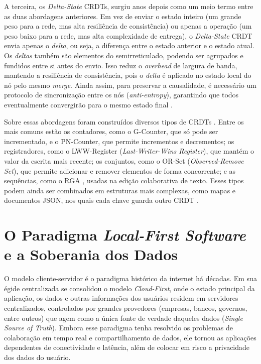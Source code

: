 A terceira, os \textit{Delta-State} CRDTs, surgiu anos depois como um meio termo entre as duas abordagens anteriores. Em vez de enviar o estado inteiro (um grande peso para a rede, mas alta
resiliência de consistência) ou apenas a operação (um peso baixo para a rede, mas alta complexidade de entrega), o \textit{Delta-State} CRDT envia apenas o \textit{delta}, ou seja,
a diferença entre o estado anterior e o estado atual. Os \textit{deltas} também são elementos do semirreticulado, podendo ser agrupados e fundidos
entre si antes do envio. Isso reduz o \textit{overhead} de largura de banda, mantendo a resiliência de consistência, pois o \textit{delta} é aplicado
no estado local do nó pelo mesmo \textit{merge}. Ainda assim, para preservar a causalidade, é necessário um protocolo de sincronização entre os nós
(\textit{anti-entropy}), garantindo que todos eventualmente convergirão para o mesmo estado final \cite{almeida2018}.

Sobre essas abordagens foram construídos diversos tipos de CRDTs \cite{shapiro2011comprehensive}. Entre os mais comuns estão os contadores,
como o G-Counter, que só pode ser incrementado, e o PN-Counter, que permite incrementos e decrementos; os registradores, como o LWW-Register
(\textit{Last-Writer-Wins Register}), que mantém o valor da escrita mais recente; os conjuntos, como o OR-Set (\textit{Observed-Remove Set}),
que permite adicionar e remover elementos de forma concorrente; e as sequências, como o RGA \cite{roh2011}, usadas na edição colaborativa
de texto. Esses tipos podem ainda ser combinados em estruturas mais complexas, como mapas e documentos JSON, nos quais cada chave guarda
outro CRDT \cite{kleppmannberesford2017}.

\section{O Paradigma \textit{Local-First Software} e a Soberania dos Dados}

O modelo cliente-servidor é o paradigma histórico da internet há décadas. Em sua égide centralizada se consolidou o
modelo \textit{Cloud-First}, onde o estado principal da aplicação, os dados e outras informações dos usuários residem em servidores
centralizados, controlados por grandes provedores (empresas, bancos, governos, entre outros) que agem como a única fonte de
verdade daqueles dados (\textit{Single Source of Truth}). Embora esse paradigma tenha resolvido os problemas de colaboração
em tempo real e compartilhamento de dados, ele tornou as aplicações dependentes de conectividade e latência, além de colocar em risco a
privacidade dos dados do usuário.

